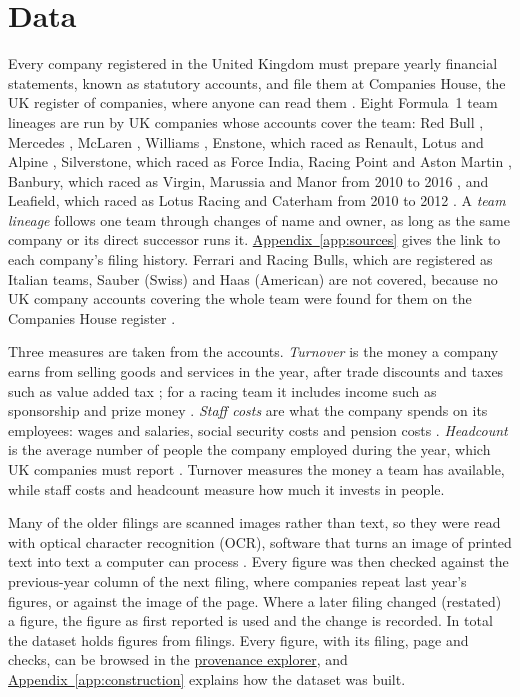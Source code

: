 \documentclass[11pt,a4paper]{article}
\newcommand{\site}{https://nahianibnat-2000.github.io/F1-moneyball}
\newcommand{\sitepage}[2]{\href{\site/#1}{#2}}
\begin{document}
\section{Data}
\label{sec:data}

Every company registered in the United Kingdom must prepare yearly financial statements, known
as statutory accounts, and file them at Companies House, the UK register of companies, where anyone can read them
\citep{companiesact2006,ch_register}. Eight Formula~1 team lineages are run by UK companies whose accounts cover the team:
Red Bull \citep{ch_redbull}, Mercedes \citep{ch_mercedes}, McLaren \citep{ch_mclaren}, Williams \citep{ch_williams},
Enstone, which raced as Renault, Lotus and Alpine \citep{ch_enstone}, Silverstone, which raced as Force India, Racing Point
and Aston Martin \citep{ch_forceindia,ch_amr}, Banbury, which raced as Virgin, Marussia and Manor from 2010 to 2016
\citep{ch_manor}, and Leafield, which raced as Lotus Racing and Caterham from 2010 to 2012 \citep{ch_caterham}. A
\textit{team lineage} follows one team through changes of name and owner, as long as the same company or its direct
successor runs it. \hyperref[app:sources]{Appendix~\ref*{app:sources}} gives the link to each company's filing history.
Ferrari and Racing Bulls, which are registered as Italian teams, Sauber (Swiss) and Haas (American) \citep{jolpica} are not
covered, because no UK company accounts covering the whole team were found for them on the Companies House register
\citep{ch_register}.

Three measures are taken from the accounts. \textit{Turnover} is the money a company earns from selling goods and services
in the year, after trade discounts and taxes such as value added tax \citep[s.~474]{companiesact2006}; for a racing team it
includes income such as sponsorship and prize money \citep{ch_manor}. \textit{Staff costs} are what the company spends on its
employees: wages and salaries, social security costs and pension costs \citep[s.~411(5)]{companiesact2006}.
\textit{Headcount} is the average number of people the company employed during the year, which UK companies must report
\citep[s.~411(1)]{companiesact2006}. Turnover measures the money a team has available, while staff costs and headcount
measure how much it invests in people.

Many of the older filings are scanned images rather than text, so they were read with optical character recognition (OCR),
software that turns an image of printed text into text a computer can process \citep{smith2007}. Every figure was then
checked against the previous-year column of the next filing, where companies repeat last year's figures, or against the
image of the page. Where a later filing changed (restated) a figure, the figure as first reported is used and the change is
recorded. In total the dataset holds \NFinFigures{} figures from \NFilings{} filings. Every figure, with its filing, page
and checks, can be browsed in the \sitepage{provenance}{provenance explorer}, and
\hyperref[app:construction]{Appendix~\ref*{app:construction}} explains how the dataset was built.
\end{document}
